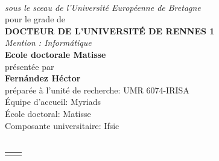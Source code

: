 \documentclass[10pt]{book}
\begin{document}
\begin{titlepage}
\begin{center}
\begin{minipage}{\glarg}
\vspace{0.5cm}
\\ \vspace{0mm}\emph{\Large sous le sceau de l'Universit\'e Europ\'eenne de Bretagne}\\ \vspace{0.5cm}
{\Large pour le grade de}\\ \vspace{2mm}
{\Large\bf DOCTEUR DE L'UNIVERSIT\'E DE RENNES 1}\\ \vspace{0.4cm}
\emph{\Large Mention : Inform{\'a}tique}\\ \vspace{2mm}
{\Large\bf Ecole doctorale Matisse}\\ \vspace{0.3cm}
{\Large pr\'esent\'ee par} \\ \vspace{3mm}
{\Huge\bf Fern{\'a}ndez  H{\'e}ctor}\\ \vspace{0.4cm}
{\Large pr\'epar\'ee \`a l'unit\'e de recherche: UMR 6074-IRISA\\
\'{E}quipe d'accueil: Myriads\\
\'{E}cole doctoral: Matisse\\
Composante universitaire: Ifsic }   \vspace{0.3cm}
\\
\hspace{-20mm}{\rule{\Glarg}{1pt}}\\
\vspace{8mm}

\begin{tabular}{p{7cm}p{10cm}}
\begin{minipage}{\plarg}
\vspace{-4cm}
\hspace{-1.8cm}{\huge\bf Intitul\'e de la th\`ese:}\vspace{5mm}

\hspace{-1.8cm}{\huge\bf Flexible Coordination}\vspace{5mm}

\hspace{-1.8cm}{\huge\bf through}\vspace{5mm}


\end{minipage}
\end{tabular}
\end{minipage}
\end{center}
\end{titlepage}
\end{document}
